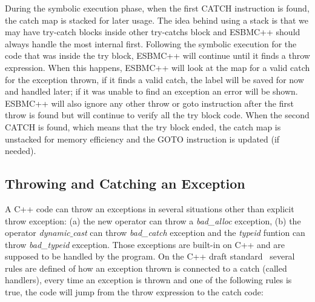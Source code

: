 \documentclass[a4paper]{llncs}
\begin{document}
During the symbolic execution phase, when the first
CATCH instruction is found, the catch map is stacked
for later usage. The idea behind using a stack is
that we may have try-catch blocks inside other
try-catchs block and ESBMC++ should always handle
the most internal first. Following the symbolic execution
for the code that was inside the try block, ESBMC++ will continue
until it finds a throw expression. When this happens, ESBMC++ will
look at the map for a valid catch for the exception thrown, if it finds
a valid catch, the label will be saved for now and handled later;
if it was unable to find an exception an error will be shown.
ESBMC++ will also ignore any other throw or goto instruction after
the first throw is found but will continue to verify all the try
block code. When the second CATCH is found, which means that the try
block ended, the catch map is unstacked for memory efficiency
and the GOTO instruction is updated (if needed).

\subsection{Throwing and Catching an Exception}

A C++ code can throw an exceptions in several situations other
than explicit throw exception: (a) the new operator can throw a \textit{bad\_alloc}
exception, (b) the operator \textit{dynamic$\_$cast} can throw \textit{bad\_catch}
exception and the \textit{typeid} funtion can throw \textit{bad\_typeid} exception.
Those exceptions are built-in on C++ and are supposed to be handled by the program.
On the C++ draft standard~\cite{CppDraft} several rules are defined of how an exception
thrown is connected to a catch (called handlers), every time an exception is thrown and
one of the following rules is true, the code will jump from the throw expression to the catch code:
\end{document}
